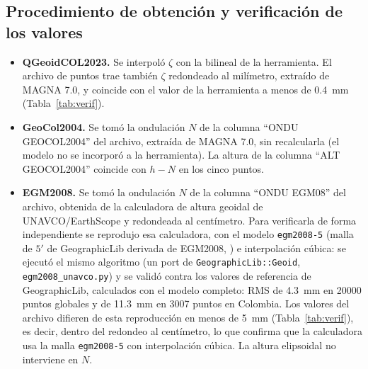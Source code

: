 \documentclass[11pt,letterpaper]{article}
\begin{document}
\subsection{Procedimiento de obtención y verificación de los valores}
\begin{itemize}
    \item \textbf{QGeoidCOL2023.} Se interpoló $\zeta$ con la bilineal de la herramienta. El
    archivo de puntos trae también $\zeta$ redondeado al milímetro, extraído de MAGNA 7.0, y coincide con
    el valor de la herramienta a menos de \SI{0.4}{mm} (Tabla~\ref{tab:verif}).
    \item \textbf{GeoCol2004.} Se tomó la ondulación $N$ de la columna ``ONDU GEOCOL2004'' del
    archivo, extraída de MAGNA 7.0, sin recalcularla (el modelo no se incorporó a la herramienta). La altura de la columna
    ``ALT GEOCOL2004'' coincide con $h-N$ en los cinco puntos.
    \item \textbf{EGM2008.} Se tomó la ondulación $N$ de la columna ``ONDU EGM08'' del archivo, obtenida
    de la calculadora de altura geoidal de UNAVCO/EarthScope \citep{unavco} y redondeada al centímetro.
    Para verificarla de forma independiente se reprodujo esa calculadora, con el modelo \texttt{egm2008-5} (malla de $5'$ de
    GeographicLib derivada de EGM2008, \citealp{karney}) e interpolación cúbica: se ejecutó el mismo
    algoritmo (un port de \texttt{GeographicLib::Geoid}, \texttt{egm2008\_unavco.py}) y se validó contra
    los valores de referencia de GeographicLib, calculados con el modelo completo: RMS de
    \SI{4.3}{mm} en \num{20000} puntos globales y de \SI{11.3}{mm} en \num{3007} puntos en Colombia.
    Los valores del archivo difieren de esta reproducción en menos de \SI{5}{mm}
    (Tabla~\ref{tab:verif}), es decir, dentro del redondeo al centímetro, lo que confirma que la
    calculadora usa la malla \texttt{egm2008-5} con interpolación cúbica. La altura elipsoidal no
    interviene en $N$.
\end{itemize}
\end{document}
